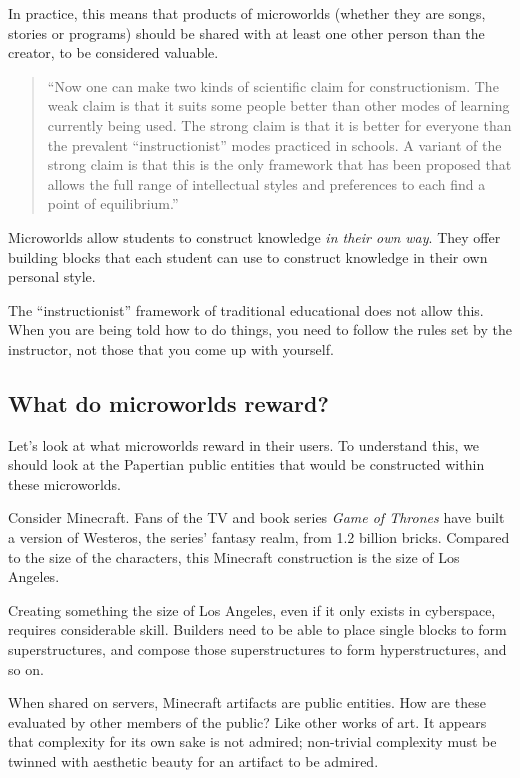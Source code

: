 In practice, this means that products of microworlds (whether they are
songs, stories or programs) should be shared with at least one other
person than the creator, to be considered valuable.

\begin{quote}
``Now one can make two kinds of scientific claim for constructionism. The
weak claim is that it suits some people better than other modes of
learning currently being used. The strong claim is that it is better for
everyone than the prevalent ``instructionist'' modes practiced in
schools. A variant of the strong claim is that this is the only
framework that has been proposed that allows the full range of
intellectual styles and preferences to each find a point of equilibrium.''\cite{sitconst}
\end{quote}

Microworlds allow students to construct knowledge \emph{in their own
way}. They offer building blocks that each student can use to construct knowledge in their own
personal style. 

The ``instructionist'' framework of traditional educational does not allow this. When you are being told how to do things, you need to follow the rules set by the instructor, not those that you come up with yourself.

\subsection{What do microworlds reward?}

Let's look at what microworlds reward in their users. To understand
this, we should look at the Papertian public entities that would be
constructed within these microworlds.

Consider Minecraft. Fans of the TV and book series \emph{Game of
Thrones} have built a version of Westeros, the series' fantasy realm,
from 1.2 billion bricks. Compared to the size of the characters, this
Minecraft construction is the size of Los Angeles\cite{westeroscraft}.

Creating something the size of Los Angeles, even if it only exists in
cyberspace, requires considerable skill. Builders need to be able to
place single blocks to form superstructures, and compose those
superstructures to form hyperstructures, and so on\cite{reddit:minecraft}.

When shared on servers, Minecraft artifacts are public entities. How are
these evaluated by other members of the public? Like other works of art.
It appears that complexity for its own sake is not admired; non-trivial
complexity must be twinned with aesthetic beauty for an artifact to be
admired\cite{mash}.


